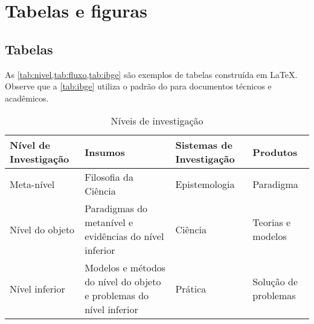 \chapter{Tabelas e figuras}

\section{Tabelas}

As \cref{tab:nivel,tab:fluxo,tab:ibge} são exemplos de tabelas construída em
\LaTeX. Observe que a \cref{tab:ibge} utiliza o padrão do  para documentos técnicos e acadêmicos.

\begin{table}[htb]
\begin{center}%
\small
\caption[Níveis de investigação]{Níveis de investigação}
\label{tab:nivel}
{\renewcommand{\arraystretch}{1.3} %
\begin{tabular}{p{2.5cm}p{5.4cm}p{2.3cm}p{2.5cm}}
    \rowcolor{verdeunb!10}\textbf{Nível de Investigação} & \textbf{Insumos}  & \textbf{Sistemas de Investigação}  & \textbf{Produtos} \\ \hline
    Meta-nível & Filosofia da Ciência  & Epistemologia & Paradigma \\ \hline
    Nível do objeto & Paradigmas do metanível e evidências do nível inferior & Ciência  & Teorias e modelos \\ \hline
    Nível inferior & Modelos e métodos do nível do objeto e problemas do nível inferior & Prática & Solução de problemas \\
\end{tabular}}
\end{center}%
\end{table}

